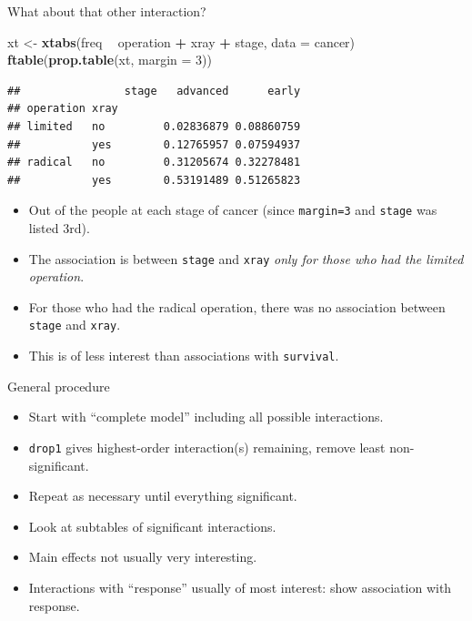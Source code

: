 \documentclass[
  ignorenonframetext,
]{beamer}
\newenvironment{Shaded}{\begin{snugshade}}{\end{snugshade}}
\newcommand{\DataTypeTok}[1]{\textcolor[rgb]{0.13,0.29,0.53}{#1}}
\newcommand{\DecValTok}[1]{\textcolor[rgb]{0.00,0.00,0.81}{#1}}
\newcommand{\KeywordTok}[1]{\textcolor[rgb]{0.13,0.29,0.53}{\textbf{#1}}}
\newcommand{\NormalTok}[1]{#1}
\newcommand{\OperatorTok}[1]{\textcolor[rgb]{0.81,0.36,0.00}{\textbf{#1}}}
\newcommand{\StringTok}[1]{\textcolor[rgb]{0.31,0.60,0.02}{#1}}
\begin{document}
\begin{frame}[fragile]{What about that other interaction?}
\protect\hypertarget{what-about-that-other-interaction}{}

\footnotesize

\begin{Shaded}
\begin{Highlighting}[]
\NormalTok{xt <-}\StringTok{ }\KeywordTok{xtabs}\NormalTok{(freq }\OperatorTok{~}\StringTok{ }\NormalTok{operation }\OperatorTok{+}\StringTok{ }\NormalTok{xray }\OperatorTok{+}\StringTok{ }\NormalTok{stage, }\DataTypeTok{data =}\NormalTok{ cancer)}
\KeywordTok{ftable}\NormalTok{(}\KeywordTok{prop.table}\NormalTok{(xt, }\DataTypeTok{margin =} \DecValTok{3}\NormalTok{))}
\end{Highlighting}
\end{Shaded}

\begin{verbatim}
##                stage   advanced      early
## operation xray                            
## limited   no         0.02836879 0.08860759
##           yes        0.12765957 0.07594937
## radical   no         0.31205674 0.32278481
##           yes        0.53191489 0.51265823
\end{verbatim}

\normalsize

\begin{itemize}
\item
  Out of the people at each stage of cancer (since \texttt{margin=3} and
  \texttt{stage} was listed 3rd).
\item
  The association is between \texttt{stage} and \texttt{xray} \emph{only
  for those who had the limited operation}.
\item
  For those who had the radical operation, there was no association
  between \texttt{stage} and \texttt{xray}.
\item
  This is of less interest than associations with \texttt{survival}.
\end{itemize}

\end{frame}

\begin{frame}[fragile]{General procedure}
\protect\hypertarget{general-procedure}{}

\begin{itemize}
\item
  Start with ``complete model'' including all possible interactions.
\item
  \texttt{drop1} gives highest-order interaction(s) remaining, remove
  least non-significant.
\item
  Repeat as necessary until everything significant.
\item
  Look at subtables of significant interactions.
\item
  Main effects not usually very interesting.
\item
  Interactions with ``response'' usually of most interest: show
  association with response.
\end{itemize}

\end{frame}
\end{document}
